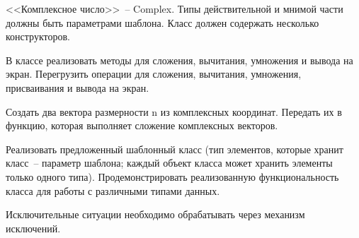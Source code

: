 
<<Комплексное число>>~-- Complex. Типы действительной и мнимой части должны быть
параметрами шаблона. Класс должен содержать несколько конструкторов.

В классе
реализовать методы для сложения, вычитания, умножения и вывода на экран. Перегрузить
операции для сложения, вычитания, умножения, присваивания и вывода на экран.

Создать
два вектора размерности n из комплексных координат. Передать их в функцию, которая
выполняет сложение комплексных векторов.

Реализовать предложенный шаблонный класс (тип элементов, которые
хранит класс~-- параметр шаблона; каждый объект класса может хранить
элементы только одного типа). Продемонстрировать реализованную
функциональность класса для работы с различными типами данных.

Исключительные ситуации необходимо обрабатывать через механизм исключений.
